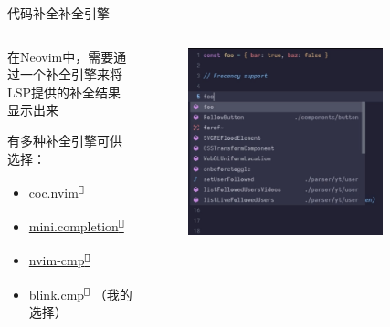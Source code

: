 \documentclass[aspectratio=169]{ctexbeamer}
\newcommand{\nerd}[1]{\texttt{#1}}
\newcommand{\link}[3][]{\href{#3}{#2\textsuperscript{\nerd{}}}}
\begin{document}
  \begin{frame}{代码补全}{补全引擎}

    \begin{columns}
      \begin{column}{0.5\linewidth}
        在Neovim中，需要通过一个补全引擎来将LSP提供的补全结果显示出来

        有多种补全引擎可供选择：
        \begin{itemize}
          \item \link{coc.nvim}{https://github.com/neoclide/coc.nvim}
          \item \link{mini.completion}{https://github.com/echasnovski/mini.completion}
          \item \link{nvim-cmp}{https://github.com/hrsh7th/nvim-cmp}
          \item \link{blink.cmp}{https://github.com/Saghen/blink.cmp} （我的选择）
        \end{itemize}

      \end{column}

      \begin{column}{0.5\linewidth}
        \begin{figure}[H]
          \centering
          \includegraphics[width=0.8\textwidth]{./Figures/Completion_demo.jpg}
        \end{figure}

      \end{column}
    \end{columns}

  \end{frame}
\end{document}
